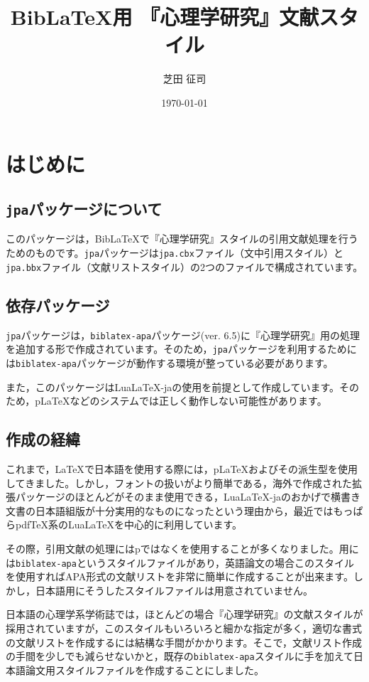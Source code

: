 \documentclass[12pt]{ltjsarticle}
\title{Bib{\LaTeX}用 『心理学研究』文献スタイル}
\author{芝田 征司}
\date{\today}
\begin{document}
\maketitle


\section{はじめに}
\subsection{\texttt{jpa}パッケージについて}
このパッケージは，Bib{\LaTeX}で『心理学研究』スタイルの引用文献処理を行うためのものです。\texttt{jpa}パッケージは\texttt{jpa.cbx}ファイル（文中引用スタイル）と\texttt{jpa.bbx}ファイル（文献リストスタイル）の2つのファイルで構成されています。

\subsection{依存パッケージ}
\texttt{jpa}パッケージは，\texttt{biblatex-apa}パッケージ(ver. 6.5)に『心理学研究』用の処理を追加する形で作成されています。そのため，\texttt{jpa}パッケージを利用するためには\texttt{biblatex-apa}パッケージが動作する環境が整っている必要があります。

また，このパッケージはLua{\LaTeX}-jaの使用を前提として作成しています。そのため，p{\LaTeX}などのシステムでは正しく動作しない可能性があります。

\subsection{作成の経緯}
これまで，{\LaTeX}で日本語を使用する際には，p{\LaTeX}およびその派生型を使用してきました。しかし，フォントの扱いがより簡単である，海外で作成された拡張パッケージのほとんどがそのまま使用できる，Lua{\LaTeX}-jaのおかげで横書き文書の日本語組版が十分実用的なものになったという理由から，最近ではもっぱらpdf{\TeX}系のLua{\LaTeX}を中心的に利用しています。

その際，引用文献の処理にはp{\BibTeX}ではなく{\BibLaTeX}を使用することが多くなりました。{\BibLaTeX}用には\texttt{biblatex-apa}というスタイルファイルがあり，英語論文の場合このスタイルを使用すればAPA形式の文献リストを非常に簡単に作成することが出来ます。しかし，日本語用にそうしたスタイルファイルは用意されていません。

日本語の心理学系学術誌では，ほとんどの場合『心理学研究』の文献スタイルが採用されていますが，このスタイルもいろいろと細かな指定が多く，適切な書式の文献リストを作成するには結構な手間がかかります。そこで，文献リスト作成の手間を少しでも減らせないかと，既存の\texttt{biblatex-apa}スタイルに手を加えて日本語論文用スタイルファイルを作成することにしました。
\end{document}
